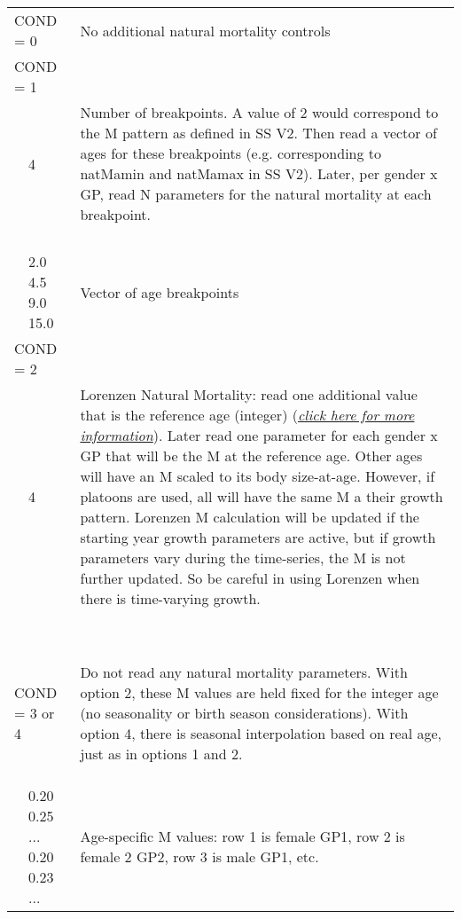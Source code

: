 \begin{center}
\begin{longtable}{p{0.5cm} p{2cm} p{12cm}}
	   \multicolumn{2}{l}{COND = 0} & No additional natural mortality controls \\
	   \multicolumn{2}{l}{COND = 1} & \\
	   & 4 & \multirow{1}{12cm}[-0.1cm]{Number of breakpoints.  A value of 2 would correspond to the M pattern as defined in SS V2.  Then read a vector of ages for these breakpoints (e.g. corresponding to natM\textunderscore amin and natM\textunderscore amax in SS V2). Later, per gender x GP, read N parameters for the natural mortality at each breakpoint.}
	   \\
	   \\
	   \\
	   \\
	   \\
	   & 2.0 4.5 9.0 15.0 & Vector of age breakpoints \\
	   \multicolumn{2}{l}{COND = 2}& \\
	   & 4 & \multirow{1}{12cm}[-0.1cm]{Lorenzen Natural Mortality: read one additional value that is the reference age (integer) (\hyperlink{Lorenzen}{\textit{click here for more information}}). Later read one parameter for each gender x GP that will be the M at the reference age.  Other ages will have an M scaled to its body size-at-age.  However, if platoons are used, all will have the same M a their growth pattern.  Lorenzen M calculation will be updated if the starting year growth parameters are active, but if growth parameters vary during the time-series, the M is not further updated.  So be careful in using Lorenzen when there is time-varying growth.}\\
	   \\
	   \\
	   \\
	   \\
	   \\
	   \\
	   \\
	   \\
	   \\
	   \multicolumn{2}{l}{COND = 3 or 4} & \multirow{1}{12cm}[-0.1cm]{Do not read any natural mortality parameters.  With option 2, these M values are held fixed for the integer age (no seasonality or birth season considerations). With option 4, there is seasonal interpolation based on real age, just as in options 1 and 2.}\\
	   \\
	   \\
	   \\
	   & 0.20 0.25 ... 0.20 0.23 ... & \multirow{1}{12cm}[-0.1cm]{Age-specific M values: row 1 is female GP1, row 2 is female 2 GP2, row 3 is male GP1, etc.}\\
	   \hline


\end{longtable}
\end{center}
